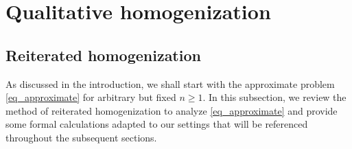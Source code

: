 \documentclass[reqno,12pt]{amsart} %
\theoremstyle{definition}
\theoremstyle{remark}
\numberwithin{equation}{section}
\newcommand{\e}{\varepsilon}
\newcommand{\jz}[1]{\textcolor{red}{#1}}
\newcommand{\doublerightarrow}{%
  \mathrel{%
    \mathchoice
      {\rightarrow\mspace{-10mu}\rightarrow} %
      {\rightarrow\mspace{-10mu}\rightarrow} %
      {\rightarrow\mspace{-10mu}\rightarrow} %
      {\rightarrow\mspace{-10mu}\rightarrow} %
  }%
}
\begin{document}


\section{Qualitative homogenization}\label{sec_qualitative-homogenization}

\subsection{Reiterated homogenization}\label{sec_approximate-problems}
As discussed in the introduction, we shall start with the approximate problem \eqref{eq_approximate} for arbitrary but fixed $n \ge 1$.
In this subsection, we review the method of reiterated homogenization to analyze \eqref{eq_approximate} and provide some formal calculations adapted to our settings that will be referenced throughout the subsequent sections. 

\end{document}
